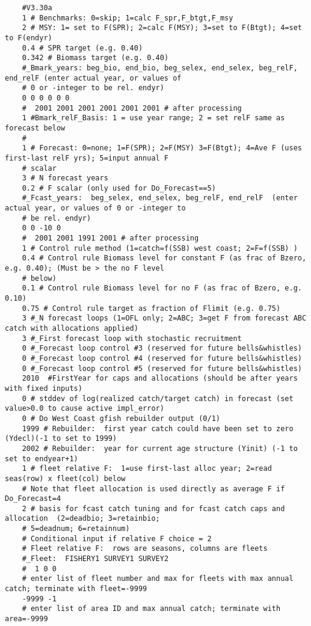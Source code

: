 \begin{landscape}
\begin{verbatim}
	#V3.30a
	1 # Benchmarks: 0=skip; 1=calc F_spr,F_btgt,F_msy 
	2 # MSY: 1= set to F(SPR); 2=calc F(MSY); 3=set to F(Btgt); 4=set to F(endyr) 
	0.4 # SPR target (e.g. 0.40)
	0.342 # Biomass target (e.g. 0.40)
	#_Bmark_years: beg_bio, end_bio, beg_selex, end_selex, beg_relF, end_relF (enter actual year, or values of
	# 0 or -integer to be rel. endyr)
	0 0 0 0 0 0
	#  2001 2001 2001 2001 2001 2001 # after processing 
	1 #Bmark_relF_Basis: 1 = use year range; 2 = set relF same as forecast below
	#
	1 # Forecast: 0=none; 1=F(SPR); 2=F(MSY) 3=F(Btgt); 4=Ave F (uses first-last relF yrs); 5=input annual F
	# scalar
	3 # N forecast years 
	0.2 # F scalar (only used for Do_Forecast==5)
	#_Fcast_years:  beg_selex, end_selex, beg_relF, end_relF  (enter actual year, or values of 0 or -integer to
	# be rel. endyr)
	0 0 -10 0
	#  2001 2001 1991 2001 # after processing 
	1 # Control rule method (1=catch=f(SSB) west coast; 2=F=f(SSB) ) 
	0.4 # Control rule Biomass level for constant F (as frac of Bzero, e.g. 0.40); (Must be > the no F level
	# below) 
	0.1 # Control rule Biomass level for no F (as frac of Bzero, e.g. 0.10) 
	0.75 # Control rule target as fraction of Flimit (e.g. 0.75) 
	3 #_N forecast loops (1=OFL only; 2=ABC; 3=get F from forecast ABC catch with allocations applied)
	3 #_First forecast loop with stochastic recruitment
	0 #_Forecast loop control #3 (reserved for future bells&whistles) 
	0 #_Forecast loop control #4 (reserved for future bells&whistles) 
	0 #_Forecast loop control #5 (reserved for future bells&whistles) 
	2010  #FirstYear for caps and allocations (should be after years with fixed inputs) 
	0 # stddev of log(realized catch/target catch) in forecast (set value>0.0 to cause active impl_error)
	0 # Do West Coast gfish rebuilder output (0/1) 
	1999 # Rebuilder:  first year catch could have been set to zero (Ydecl)(-1 to set to 1999)
	2002 # Rebuilder:  year for current age structure (Yinit) (-1 to set to endyear+1)
	1 # fleet relative F:  1=use first-last alloc year; 2=read seas(row) x fleet(col) below
	# Note that fleet allocation is used directly as average F if Do_Forecast=4 
	2 # basis for fcast catch tuning and for fcast catch caps and allocation  (2=deadbio; 3=retainbio; 
	# 5=deadnum; 6=retainnum)
	# Conditional input if relative F choice = 2
	# Fleet relative F:  rows are seasons, columns are fleets
	#_Fleet:  FISHERY1 SURVEY1 SURVEY2
	#  1 0 0
	# enter list of fleet number and max for fleets with max annual catch; terminate with fleet=-9999
	-9999 -1
	# enter list of area ID and max annual catch; terminate with area=-9999

\end{verbatim}
\end{landscape}
